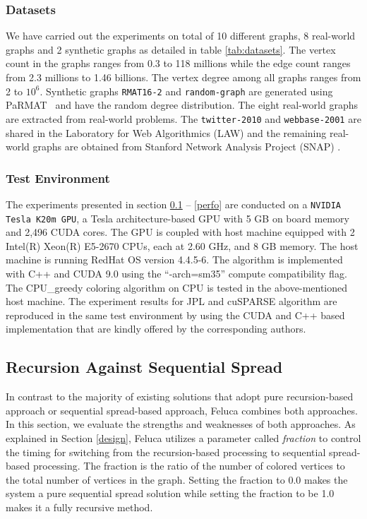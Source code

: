 \subsubsection{Datasets}
\label{subsec.datasets}
We have carried out the experiments on total of 10 different graphs, 8 real-world graphs and 2 synthetic graphs as detailed in table \ref{tab:datasets}. The vertex count in the graphs ranges from 0.3 to 118 millions while the edge count ranges from 2.3 millions to 1.46 billions. The vertex degree among all graphs ranges from 2 to $10^6$. 
Synthetic graphs \texttt{RMAT16-2} and \texttt{random-graph} are generated using PaRMAT~\cite{pactsimd} and have the random degree distribution. The eight real-world graphs are extracted from real-world problems. The \texttt{twitter-2010} and \texttt{webbase-2001} are shared in the Laboratory for Web Algorithmics (LAW) \cite{law} and the remaining real-world graphs are obtained from Stanford Network Analysis Project (SNAP) \cite{snap}.

\subsubsection{Test Environment}
The experiments presented in section \ref{subsec.recvsaseq} -- \ref{perfo} are conducted on a \texttt{NVIDIA Tesla K20m GPU}, a Tesla architecture-based GPU with 5 GB on board memory and 2,496 CUDA cores. The GPU is coupled with host machine equipped with 2 Intel(R) Xeon(R) E5-2670 CPUs, each at 2.60 GHz, and 8 GB memory. The host machine is running RedHat OS version 4.4.5-6. The algorithm is implemented with C++ and CUDA 9.0 using the ``-arch=sm35'' compute compatibility flag. The CPU\_greedy coloring algorithm on CPU is tested in the above-mentioned host machine. The experiment results for JPL and cuSPARSE algorithm \cite{nvidiaTR} are reproduced in the same test environment by using the CUDA and C++ based implementation that are kindly offered by the corresponding authors.

\subsection{Recursion Against Sequential Spread}
\label{subsec.recvsaseq}
In contrast to the majority of existing solutions that adopt pure recursion-based approach or sequential spread-based approach, Feluca combines both approaches. In this section, we evaluate the strengths and weaknesses of both approaches. As explained in Section \ref{design}, Feluca utilizes a parameter called \textit{fraction} to control the timing for switching from the recursion-based processing to sequential spread-based processing. The fraction is the ratio of the number of colored vertices to the total number of vertices in the graph. Setting the fraction to 0.0 makes the system a pure sequential spread solution while setting the fraction to be 1.0 makes it a fully recursive method. 

